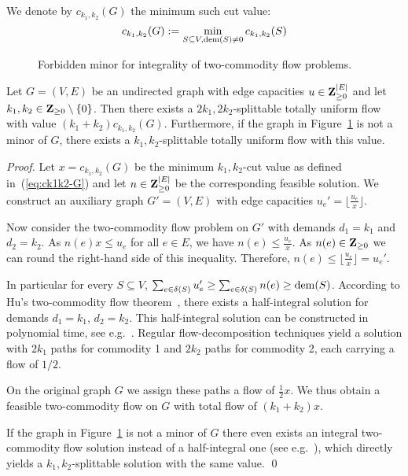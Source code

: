 We denote by $c_{k_1,k_2}(G)$ the minimum such cut value:
\begin{equation}
  \label{eq:ck1k2-G}
  c_{k_1,k_2}(G):=\min_{S\subseteq V,\operatorname{dem}(S)\neq 0}c_{k_1,k_2}(S)  
\end{equation}

\begin{figure}
  \centering
  \caption{Forbidden minor for integrality of two-commodity flow problems.}
  \label{fig:bad-minor}
\end{figure}
\begin{lemma}\label{lem:2k-totally-uniform}
  Let $G=(V,E)$ be an undirected graph with edge capacities
  $u\in\mathbf{Z}_{\geq 0}^{|E|}$ and let $k_1,k_2\in\mathbf{Z}_{\geq 0}\setminus
  \{0\}$. Then there exists a $2k_1,2k_2$-splittable totally uniform
  flow with value $(k_1+k_2)c_{k_1,k_2}(G)$. Furthermore, if the graph
  in Figure~\ref{fig:bad-minor} is not a minor of $G$, there exists a
  $k_1,k_2$-splittable totally uniform flow with this value.
\end{lemma}
\begin{proof}
  Let $x=c_{k_1,k_2}(G)$ be the minimum $k_1,k_2$-cut value as defined
  in~(\ref{eq:ck1k2-G}) and let $n \in \mathbf{Z}_{\geq 0}^{|E|}$ be the 
  corresponding feasible solution.  We construct an auxiliary graph $G'=(V,E)$
  with edge capacities $u_e'=\lfloor\tfrac{u_e}{x}\rfloor$.

  Now
  consider the two-commodity flow problem on $G'$ with demands
  $d_1=k_1$ and $d_2=k_2$. As $n(e)x \leq u_e$ for all $e \in E$,
  we have $n(e) \leq \frac{u_e}{x}$. As $n(e) \in \mathbf{Z}_{\geq 0}$ we
  can round the right-hand side of this inequality. Therefore,
  $n(e) \leq \lfloor\tfrac{u_e}{x}\rfloor = u_e'$. 
  
  In particular for every $S\subseteq V$, $\sum_{e\in\delta(S)} u_e'
  \geq \sum_{e \in \delta(S)}{n(e)} \geq \operatorname{dem}(S)$.  According to Hu's
  two-commodity flow theorem~\cite{hu:63}, there exists a
  half-integral solution for demands $d_1 = k_1$, $d_2=k_2$.  This
  half-integral solution can be constructed in polynomial time, see
  e.g.~\cite[Theorem 71.1b]{Schrijver:03:CoOptC}. Regular
  flow-decomposition techniques yield a solution with $2k_1$ paths for
  commodity 1 and $2k_2$ paths for commodity 2, each carrying a flow
  of $1/2$.
  
  On the original graph $G$ we assign these paths a flow of
  $\tfrac{1}{2}x$. We thus obtain a feasible two-commodity flow on $G$
  with total flow of $(k_1+k_2)x$. 

  If the graph in Figure~\ref{fig:bad-minor} is not a minor of $G$ 
  there even exists an integral two-commodity flow solution instead of a
  half-integral one (see e.g.~\cite[Theorem 71.2]{Schrijver:03:CoOptC}),
  which directly yields a $k_1,k_2$-splittable solution with the 
  same value.
\qed \end{proof}

